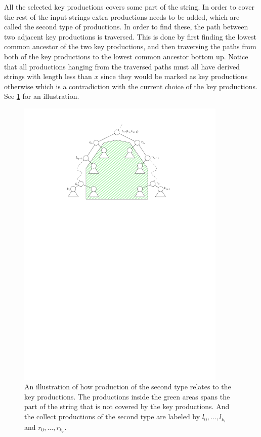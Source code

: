 \documentclass[twoside,11pt,openright]{report}
\begin{document}
All the selected key productions covers some part of the string. In order to cover the rest of the input strings extra productions needs to be added, which are called the second type of productions. In order to find these, the path between two adjacent key productions is traversed. This is done by first finding the lowest common ancestor of the two key productions, and then traversing the paths from both of the key productions to the lowest common ancestor bottom up. Notice that all productions hanging from the traversed paths must all have derived strings with length less than $x$ since they would be marked as key productions otherwise which is a contradiction with the current choice of the key productions. See \cref{fig:slp-2nd-type} for an illustration.

\begin{figure}[htb]
  \centering
  \includegraphics[width=10cm]{images/slp-2nd-type}
  \caption{An illustration of how production of the second type relates to the key productions. The productions inside the green areas spans the part of the string that is not covered by the key productions. And the collect productions of the second type are labeled by $l_0, \dots, l_{k_l}$ and $r_0, \dots, r_{k_r}$.}
  \label{fig:slp-2nd-type}
\end{figure}
\end{document}
